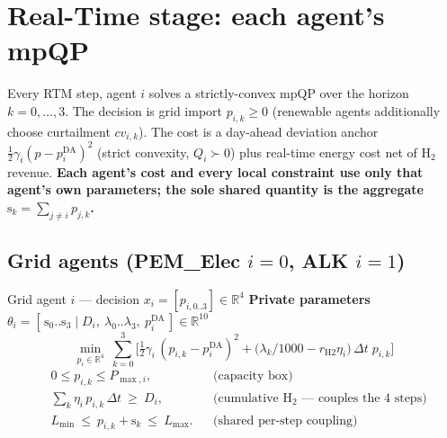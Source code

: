 \documentclass[11pt, letterpaper]{article}
\begin{document}
\section{Real-Time stage: each agent's mpQP}
Every RTM step, agent $i$ solves a strictly-convex mpQP over the horizon $k=0,\dots,3$. The decision
is grid import $p_{i,k}\ge0$ (renewable agents additionally choose curtailment $cv_{i,k}$). The cost
is a day-ahead deviation anchor $\tfrac12\gamma_i(p-p^{\mathrm{DA}}_i)^2$ (strict convexity,
$Q_i\succ0$) plus real-time energy cost net of H$_2$ revenue. \textbf{Each agent's cost and every
local constraint use only that agent's own parameters; the sole shared quantity is the aggregate
$\mathrm{s}_k=\sum_{j\ne i}p_{j,k}$.}

\subsection{Grid agents (PEM\_Elec $i{=}0$, ALK $i{=}1$)}
\begin{agentbox}{Grid agent $i$ --- decision $x_i=[p_{i,0..3}]\in\mathbb R^4$}
\textbf{Private parameters} $\theta_i=[\,\mathrm{s}_0..\mathrm{s}_3\mid D_i,\ \lambda_0..\lambda_3,\ p^{\mathrm{DA}}_i\,]\in\mathbb R^{10}$
\[
\min_{p_i\in\mathbb R^4}\ \sum_{k=0}^{3}\Big[\tfrac12\gamma_i\,(p_{i,k}-p^{\mathrm{DA}}_i)^2
   +\big(\lambda_k/1000-r_{\mathrm{H2}}\eta_i\big)\,\Delta t\;p_{i,k}\Big]
\]
\vspace{-8pt}
\[
\begin{aligned}
&0\le p_{i,k}\le P_{\max,i}, &&\text{(capacity box)}\\
&\textstyle\sum_{k}\eta_i\,p_{i,k}\,\Delta t\ \ge\ D_i, &&\text{(cumulative H$_2$ --- couples the 4 steps)}\\
&L_{\min}\ \le\ p_{i,k}+\mathrm{s}_k\ \le\ L_{\max}. &&\text{(shared per-step coupling)}
\end{aligned}
\]
\end{agentbox}
\end{document}
